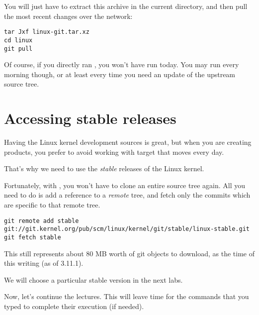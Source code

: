 You will just have to extract this archive in the current directory,
and then pull the most recent changes over the network:

\begin{verbatim}
tar Jxf linux-git.tar.xz
cd linux
git pull
\end{verbatim}

Of course, if you directly ran , you won't have run 
 today. You may run  every morning though,
or at least every time you need an update of the upstream source tree.

\section{Accessing stable releases}

Having the Linux kernel development sources is great, but when you are 
creating products, you prefer to avoid working with target that moves
every day.

That's why we need to use the {\em stable} releases of the Linux
kernel.

Fortunately, with , you won't have to clone an entire source
tree again. All you need to do is add a reference to a {\em remote}
tree, and fetch only the commits which are specific to that remote tree.

{\footnotesize
\begin{verbatim}
git remote add stable git://git.kernel.org/pub/scm/linux/kernel/git/stable/linux-stable.git
git fetch stable
\end{verbatim}
}

This still represents about 80 MB worth of git objects to download, as
the time of this writing (as of 3.11.1).

We will choose a particular stable version in the next labs.

Now, let's continue the lectures. This will leave time for the commands
that you typed to complete their execution (if needed).
